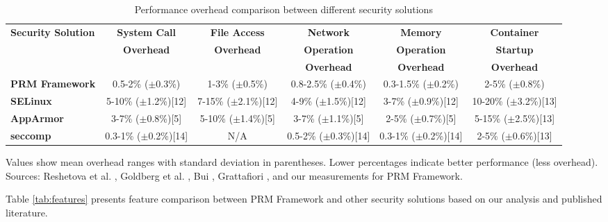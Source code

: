 \documentclass[conference]{IEEEtran}
\begin{document}
\begin{table}[htbp]
\caption{Performance overhead comparison between different security solutions}
\label{tab:performance}
\centering
\begin{tabular}{|l|c|c|c|c|c|}
\hline
\textbf{Security Solution} & \textbf{System Call} & \textbf{File Access} & \textbf{Network} & \textbf{Memory} & \textbf{Container} \\
 & \textbf{Overhead} & \textbf{Overhead} & \textbf{Operation} & \textbf{Operation} & \textbf{Startup} \\
 &  &  & \textbf{Overhead} & \textbf{Overhead} & \textbf{Overhead} \\
\hline
\textbf{PRM Framework} & 0.5-2\% ($\pm$0.3\%) & 1-3\% ($\pm$0.5\%) & 0.8-2.5\% ($\pm$0.4\%) & 0.3-1.5\% ($\pm$0.2\%) & 2-5\% ($\pm$0.8\%) \\
\hline
\textbf{SELinux} & 5-10\% ($\pm$1.2\%)[12] & 7-15\% ($\pm$2.1\%)[12] & 4-9\% ($\pm$1.5\%)[12] & 3-7\% ($\pm$0.9\%)[12] & 10-20\% ($\pm$3.2\%)[13] \\
\hline
\textbf{AppArmor} & 3-7\% ($\pm$0.8\%)[5] & 5-10\% ($\pm$1.4\%)[5] & 3-7\% ($\pm$1.1\%)[5] & 2-5\% ($\pm$0.7\%)[5] & 5-15\% ($\pm$2.5\%)[13] \\
\hline
\textbf{seccomp} & 0.3-1\% ($\pm$0.2\%)[14] & N/A & 0.5-2\% ($\pm$0.3\%)[14] & 0.3-1\% ($\pm$0.2\%)[14] & 2-5\% ($\pm$0.6\%)[13] \\
\hline
\end{tabular}
\begin{tablenotes}
\small
\item Values show mean overhead ranges with standard deviation in parentheses. Lower percentages indicate better performance (less overhead). Sources: Reshetova et al. \cite{reshetova2016security}, Goldberg et al. \cite{goldberg2019performance}, Bui \cite{bui2015analysis}, Grattafiori \cite{grattafiori2016understanding}, and our measurements for PRM Framework.
\end{tablenotes}
\end{table}

Table \ref{tab:features} presents feature comparison between PRM Framework and other security solutions based on our analysis and published literature.
\end{document}
